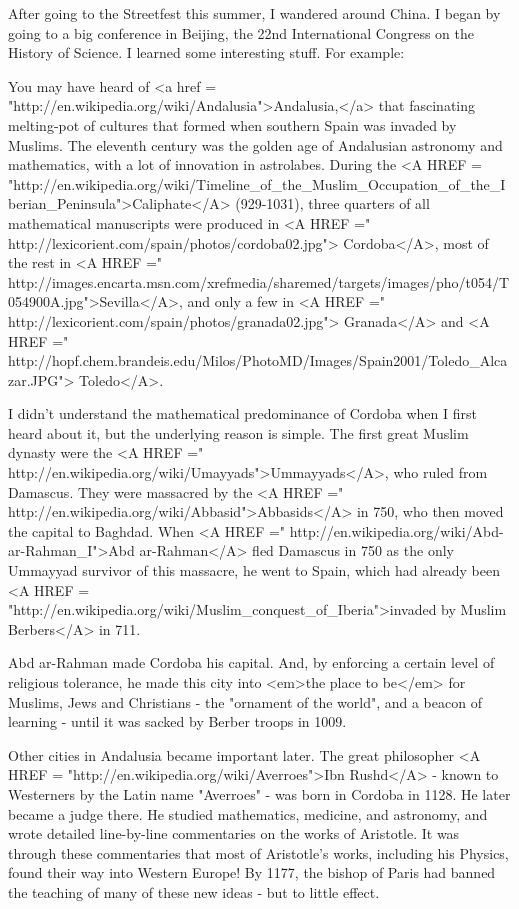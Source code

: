 

After going to the Streetfest this summer, I wandered around China.  
I began by going to a big conference in Beijing, the 22nd 
International Congress on the History of Science.  I learned some 
interesting stuff.  For example:  

You may have heard of <a href = 
"http://en.wikipedia.org/wiki/Andalusia">Andalusia,</a> 
that fascinating melting-pot
of cultures that formed when southern Spain was invaded by Muslims.
The eleventh century was the golden age of Andalusian astronomy 
and mathematics, with a lot of innovation in astrolabes.  During 
the <A HREF = "http://en.wikipedia.org/wiki/Timeline_of_the_Muslim_Occupation_of_the_Iberian_Peninsula">Caliphate</A> (929-1031), three quarters of all mathematical 
manuscripts were produced in 
<A HREF =" http://lexicorient.com/spain/photos/cordoba02.jpg">
Cordoba</A>, most of the rest in 
<A HREF =" http://images.encarta.msn.com/xrefmedia/sharemed/targets/images/pho/t054/T054900A.jpg">Sevilla</A>, and 
only a few in 
<A HREF =" http://lexicorient.com/spain/photos/granada02.jpg">
Granada</A> and 
<A HREF =" http://hopf.chem.brandeis.edu/Milos/PhotoMD/Images/Spain2001/Toledo_Alcazar.JPG">
Toledo</A>.   

I didn't understand the mathematical predominance of Cordoba when 
I first heard about it, but the underlying reason is simple.  
The first great Muslim dynasty were the 
<A HREF =" http://en.wikipedia.org/wiki/Umayyads">Ummayyads</A>,
who ruled from Damascus.   They were massacred by the
<A HREF =" http://en.wikipedia.org/wiki/Abbasid">Abbasids</A> 
in 750, who then moved the capital to Baghdad.
When <A HREF =" http://en.wikipedia.org/wiki/Abd-ar-Rahman_I">Abd 
ar-Rahman</A> fled Damascus in 750 as the only Ummayyad
survivor of this massacre, he went to Spain, which 
had already been <A HREF = "http://en.wikipedia.org/wiki/Muslim_conquest_of_Iberia">invaded by Muslim Berbers</A> in 711.

Abd ar-Rahman made Cordoba his capital.  And, by enforcing a certain 
level of religious tolerance, he made this city into <em>the place to 
be</em> for Muslims, Jews and Christians - the "ornament of the 
world", 
and a beacon of learning - until it was sacked by Berber troops in 
1009.  

Other cities in Andalusia became important later.  The great 
philosopher <A HREF = "http://en.wikipedia.org/wiki/Averroes">Ibn 
Rushd</A> - known to Westerners by the Latin name 
"Averroes" - was born in Cordoba in 1128.  He later became a judge 
there.  He studied mathematics, medicine, and astronomy, and wrote 
detailed line-by-line commentaries on the works of Aristotle.  It 
was through these commentaries that most of Aristotle's works, 
including his Physics, found their way into Western Europe!  By 1177, 
the bishop of Paris had banned the teaching of many of these new
ideas - but to little effect. 

